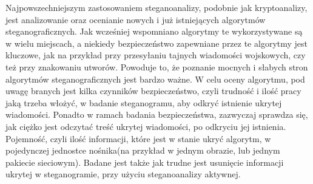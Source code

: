 \documentclass[a4paper, twoside, 12pt]{report}
\begin{document}
        Najpowszechniejszym zastosowaniem steganoanalizy, podobnie jak kryptoanalizy,
        jest analizowanie oraz ocenianie nowych i już istniejących algorytmów steganograficznych.
        Jak wcześniej wspomniano algorytmy te wykorzystywane są w wielu miejscach,
        a niekiedy bezpieczeństwo zapewniane przez te algorytmy jest kluczowe, jak
        na przykład przy przesyłaniu tajnych wiadomości wojskowych, czy też przy znakowaniu
        utworów. Powoduje to, że poznanie mocnych i słabych stron algorytmów steganograficznych
        jest bardzo ważne. W celu oceny algorytmu, pod uwagę branych jest kilka czynników
        bezpieczeństwo, czyli trudność i ilość pracy jaką trzeba włożyć,
        w badanie steganogramu, aby odkryć istnienie ukrytej wiadomości.
        Ponadto w ramach badania bezpieczeństwa, zazwyczaj sprawdza się, jak ciężko
        jest odczytać treść ukrytej wiadomości, po odkryciu jej istnienia.
        Pojemność, czyli
        ilość informacji, które jest w stanie ukryć algorytm, w pojedynczej jednostce
        nośnika(na przykład w jednym obrazie, lub jednym pakiecie sieciowym). Badane
        jest także jak trudne jest usunięcie informacji ukrytej w steganogramie, przy
        użyciu steganoanalizy aktywnej.
\end{document}
